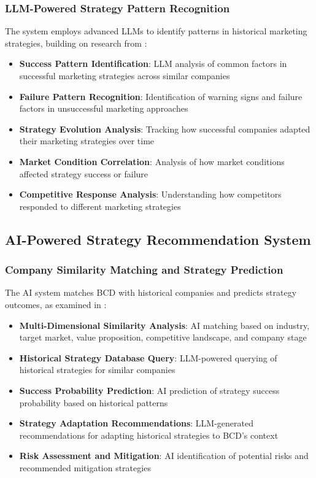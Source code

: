 \subsubsection{LLM-Powered Strategy Pattern Recognition}

The system employs advanced LLMs to identify patterns in historical marketing strategies, building on research from \citep{simas_humanai_interaction_an}:

\begin{itemize}
    \item \textbf{Success Pattern Identification}: LLM analysis of common factors in successful marketing strategies across similar companies
    \item \textbf{Failure Pattern Recognition}: Identification of warning signs and failure factors in unsuccessful marketing approaches
    \item \textbf{Strategy Evolution Analysis}: Tracking how successful companies adapted their marketing strategies over time
    \item \textbf{Market Condition Correlation}: Analysis of how market conditions affected strategy success or failure
    \item \textbf{Competitive Response Analysis}: Understanding how competitors responded to different marketing strategies
\end{itemize}

\subsection{AI-Powered Strategy Recommendation System}

\subsubsection{Company Similarity Matching and Strategy Prediction}

The AI system matches BCD with historical companies and predicts strategy outcomes, as examined in \citep{balcıoğlu_aidriven_personalization_in}:

\begin{itemize}
    \item \textbf{Multi-Dimensional Similarity Analysis}: AI matching based on industry, target market, value proposition, competitive landscape, and company stage
    \item \textbf{Historical Strategy Database Query}: LLM-powered querying of historical strategies for similar companies
    \item \textbf{Success Probability Prediction}: AI prediction of strategy success probability based on historical patterns
    \item \textbf{Strategy Adaptation Recommendations}: LLM-generated recommendations for adapting historical strategies to BCD's context
    \item \textbf{Risk Assessment and Mitigation}: AI identification of potential risks and recommended mitigation strategies
\end{itemize}

